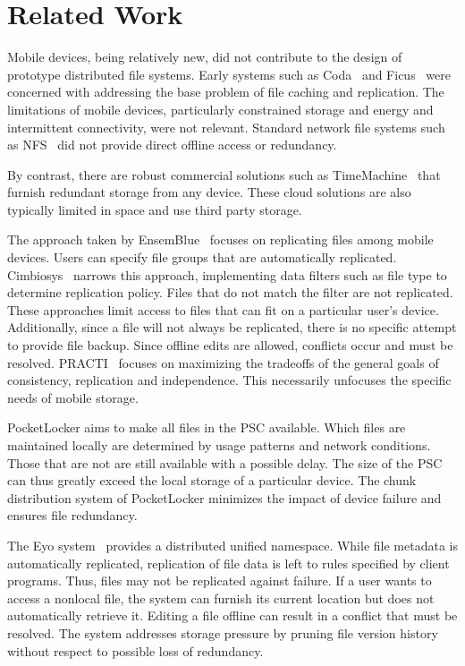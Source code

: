 
\section{Related Work}
\label{sec-related}

Mobile devices, being relatively new, did not contribute to the design of
prototype distributed file systems.  Early systems such as Coda~\cite{kistler1992disconnected} and
Ficus~\cite{guy1990implementation} were concerned with addressing the base problem of file caching
and replication.  The limitations of mobile devices, particularly constrained
storage and energy and intermittent connectivity, were not relevant.  Standard
network file systems such as NFS~\cite{nowicki1989nfs} did not provide direct
offline access or redundancy.

By contrast, there are robust commercial solutions
such as TimeMachine~\cite{timemachine} that furnish redundant storage from any device.
These cloud solutions are also typically limited in space and use third party storage.


The approach taken by
EnsemBlue~\cite{peek2006ensemblue} focuses on replicating files among mobile
devices.  Users can specify file groups that are automatically replicated.  
Cimbiosys~\cite{ramasubramanian2009cimbiosys} narrows this approach, implementing data filters such as file
type to determine replication policy.  Files that do not match
the filter are not replicated.  These approaches
limit access to files that can fit on a particular user's
device.  Additionally, since a file will not always be replicated,
there is no specific attempt to provide file
backup.  Since offline edits are allowed, conflicts occur and must be resolved.
PRACTI~\cite{belaramani2006practi} focuses on maximizing the tradeoffs of the general
goals of consistency, replication and independence.  This necessarily
unfocuses the specific needs of mobile storage.

PocketLocker aims to make all files in the PSC available.
Which files are maintained locally are determined by usage patterns and
network conditions.  Those that are not are still available with a possible
delay.  The size of the PSC can thus greatly exceed the local storage of
a particular device.  The chunk distribution system of PocketLocker
minimizes the impact of device failure and ensures file redundancy.

The Eyo system~\cite{strauss2010device} provides a distributed unified
namespace.  While file metadata is automatically replicated, replication of
file data is left to rules specified by client
programs.  Thus, files may not be replicated against failure.
If a user wants to access a nonlocal file,
the system can furnish its current location but does not
automatically retrieve it.  Editing a file offline can result in a conflict
that must be resolved.  The system addresses
storage pressure by pruning file version history without respect to possible
loss of redundancy.

